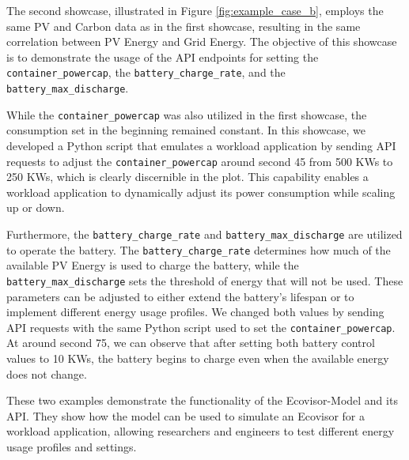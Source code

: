 The second showcase, illustrated in Figure \ref{fig:example_case_b}, employs the
same PV and Carbon data as in the first showcase, resulting in the same
correlation between PV Energy and Grid Energy. The objective of this showcase is
to demonstrate the usage of the API endpoints for setting the
\texttt{container\_powercap}, the \texttt{battery\_charge\_rate}, and the
\texttt{battery\_max\_discharge}.

While the \texttt{container\_powercap} was also utilized in the first showcase,
the consumption set in the beginning remained constant. In this showcase, we
developed a Python script that emulates a workload application by sending API
requests to adjust the \texttt{container\_powercap} around second 45 from 500
KWs to 250 KWs, which is clearly discernible in the plot. This capability
enables a workload application to dynamically adjust its power consumption while
scaling up or down.

Furthermore, the \texttt{battery\_charge\_rate} and
\texttt{battery\_max\_discharge} are utilized to operate the battery. The
\texttt{battery\_charge\_rate} determines how much of the available PV Energy is
used to charge the battery, while the \texttt{battery\_max\_discharge} sets the
threshold of energy that will not be used. These parameters can be adjusted to
either extend the battery's lifespan or to implement different energy usage
profiles. We changed both values by sending API requests with the same Python
script used to set the \texttt{container\_powercap}. At around second 75, we can
observe that after setting both battery control values to 10 KWs, the battery
begins to charge even when the available energy does not change.

These two examples demonstrate the functionality of the Ecovisor-Model and its
API. They show how the model can be used to simulate an Ecovisor for a workload
application, allowing researchers and engineers to test different energy usage
profiles and settings.
